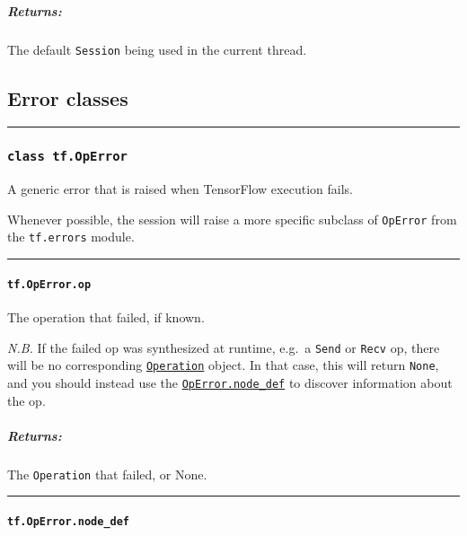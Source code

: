 \subparagraph{Returns: }\label{returns-2}

The default \texttt{Session} being used in the current thread.

\subsection{Error classes }\label{error-classes}

\begin{center}\rule{0.5\linewidth}{\linethickness}\end{center}

\subsubsection{\texorpdfstring{\texttt{class\ tf.OpError}
}{class tf.OpError }}\label{class-tf.operror}

A generic error that is raised when TensorFlow execution fails.

Whenever possible, the session will raise a more specific subclass of
\texttt{OpError} from the \texttt{tf.errors} module.

\begin{center}\rule{0.5\linewidth}{\linethickness}\end{center}

\paragraph{\texorpdfstring{\texttt{tf.OpError.op}
}{tf.OpError.op }}\label{tf.operror.op}

The operation that failed, if known.

\emph{N.B.} If the failed op was synthesized at runtime, e.g.~a
\texttt{Send} or \texttt{Recv} op, there will be no corresponding
\href{../../api_docs/python/framework.md\#Operation}{\texttt{Operation}}
object. In that case, this will return \texttt{None}, and you should
instead use the
\protect\hyperlink{OpError.nodeux5fdef}{\texttt{OpError.node\_def}} to
discover information about the op.

\subparagraph{Returns: }\label{returns-3}

The \texttt{Operation} that failed, or None.

\begin{center}\rule{0.5\linewidth}{\linethickness}\end{center}

\paragraph{\texorpdfstring{\texttt{tf.OpError.node\_def}
}{tf.OpError.node\_def }}\label{tf.operror.nodeux5fdef}

